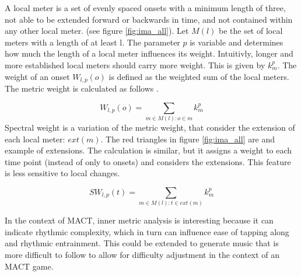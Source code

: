 A local meter is a set of evenly spaced onsets with a minimum length of three, not able to be extended forward or backwards in time, and not contained within any other local meter. (see figure \ref{fig:ima_all}). Let $M(l)$ be the set of local meters with a length of at least l. The parameter $p$ is variable and determines how much the length of a local meter influences its weight. Intuitivly, longer and more established local meters should carry more weight. This is given by $k_{m}^p$. The weight of an onset $W_{l,p}(o)$ is defined as the weighted sum of the local meters.  
The metric weight is calculated as follows \cite{Volk2008Syncopation}.  

\begin{equation}
    W_{l,p}(o) = \sum_{m \in M(l):o \in m}k_{m}^{p}
\end{equation} 
Spectral weight is a variation of the metric weight, that consider the extension of each local meter: $ext(m)$. The red triangles in figure \ref{fig:ima_all} are and example of extensions. The calculation is similar, but it assigns a weight to each time point (instead of only to onsets) and considers the extensions. This feature is less sensitive to local changes.

\begin{equation}
    SW_{l,p}(t) = \sum_{m \in M(l):t \in ext(m)}k_{m}^{p}
\end{equation}

In the context of MACT, inner metric analysis is interesting because it can indicate rhythmic complexity, which in turn can influence ease of tapping along \cite{Volk2008Syncopation} and rhythmic entrainment. This could be extended to generate music that is more difficult to follow to allow for difficulty adjustment in the context of an MACT game. 

